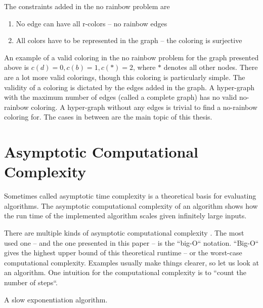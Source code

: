\documentclass[msc,lith,english]{liuthesis}
\begin{document}
The constraints added in the no rainbow problem are
\begin{enumerate}
  \item No edge can have all r-colors -- no rainbow edges
  \item All colors have to be represented in the graph -- the coloring is surjective
\end{enumerate}

An example of a valid coloring in the no rainbow problem for the graph presented above is $c(d)=0, c(b)=1, c(*)=2$, where $*$ denotes all other nodes.
There are a lot more valid colorings, though this coloring is particularly simple.
The validity of a coloring is dictated by the edges added in the graph.
A hyper-graph with the maximum number of edges (called a complete graph) has no valid no-rainbow coloring.
A hyper-graph without any edges is trivial to find a no-rainbow coloring for.
The cases in between are the main topic of this thesis.

\cite{sourceHyper}

\section{Asymptotic Computational Complexity}
Sometimes called asymptotic time complexity is a theoretical basis for evaluating algorithms.
The asymptotic computational complexity of an algorithm shows how the run time
of the implemented algorithm scales given infinitely large inputs.


There are multiple kinds of asymptotic computational complexity \cite[Chapter 3]{sourceAlgoBook}. The most used
one -- and the one presented in this paper -- is the ``big-O`` notation. ``Big-O``
gives the highest upper bound of this theoretical runtime -- or the worst-case
computational complexity. Examples usually make things clearer, so let us look at an algorithm.
One intuition for the computational complexity is to ``count the number of steps``.

\begin{algorithm}
\caption{A slow exponentiation algorithm.}\label{algDivSlow}
\DontPrintSemicolon
{}

\end{algorithm}
\end{document}
